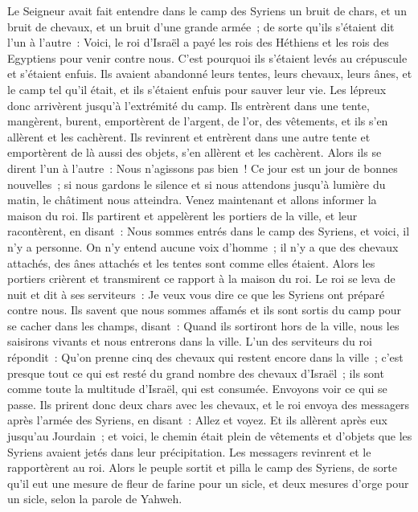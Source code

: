 \begin{multicols}{2}
Le Seigneur avait fait entendre dans le camp des Syriens un bruit de chars, et un bruit de chevaux, et un bruit d'une grande armée~; de sorte qu'ils s'étaient dit l'un à l'autre~: Voici, le roi d'Israël a payé les rois des Héthiens et les rois des Egyptiens pour venir contre nous.
C'est pourquoi ils s'étaient levés au crépuscule et s'étaient enfuis. Ils avaient abandonné leurs tentes, leurs chevaux, leurs ânes, et le camp tel qu'il était, et ils s'étaient enfuis pour sauver leur vie.
Les lépreux donc arrivèrent jusqu'à l'extrémité du camp. Ils entrèrent dans une tente, mangèrent, burent, emportèrent de l'argent, de l'or, des vêtements, et ils s'en allèrent et les cachèrent. Ils revinrent et entrèrent dans une autre tente et emportèrent de là aussi des objets, s'en allèrent et les cachèrent.
Alors ils se dirent l'un à l'autre~: Nous n'agissons pas bien~! Ce jour est un jour de bonnes nouvelles~; si nous gardons le silence et si nous attendons jusqu'à lumière du matin, le châtiment nous atteindra. Venez maintenant et allons informer la maison du roi.
Ils partirent et appelèrent les portiers de la ville, et leur racontèrent, en disant~: Nous sommes entrés dans le camp des Syriens, et voici, il n'y a personne. On n'y entend aucune voix d'homme~; il n'y a que des chevaux attachés, des ânes attachés et les tentes sont comme elles étaient.
Alors les portiers crièrent et transmirent ce rapport à la maison du roi.
Le roi se leva de nuit et dit à ses serviteurs~: Je veux vous dire ce que les Syriens ont préparé contre nous. Ils savent que nous sommes affamés et ils sont sortis du camp pour se cacher dans les champs, disant~: Quand ils sortiront hors de la ville, nous les saisirons vivants et nous entrerons dans la ville.
L'un des serviteurs du roi répondit~: Qu'on prenne cinq des chevaux qui restent encore dans la ville~; c'est presque tout ce qui est resté du grand nombre des chevaux d'Israël~; ils sont comme toute la multitude d'Israël, qui est consumée. Envoyons voir ce qui se passe.
Ils prirent donc deux chars avec les chevaux, et le roi envoya des messagers après l'armée des Syriens, en disant~: Allez et voyez.
Et ils allèrent après eux jusqu'au Jourdain~; et voici, le chemin était plein de vêtements et d'objets que les Syriens avaient jetés dans leur précipitation. Les messagers revinrent et le rapportèrent au roi.
Alors le peuple sortit et pilla le camp des Syriens, de sorte qu'il eut une mesure de fleur de farine pour un sicle, et deux mesures d'orge pour un sicle, selon la parole de Yahweh.

\end{multicols}
